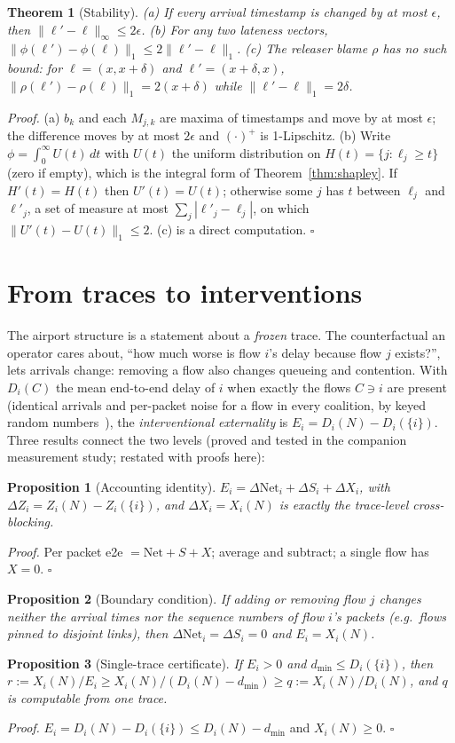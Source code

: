 \documentclass[11pt]{article}
\newtheorem{theorem}{Theorem}
\newtheorem{proposition}{Proposition}
\theoremstyle{definition}
\newcommand{\Net}{\mathrm{Net}}
\begin{document}
\begin{theorem}[Stability]\label{thm:stability}
(a) If every arrival timestamp is changed by at most $\epsilon$, then $\|\ell'-\ell\|_\infty\le2\epsilon$. (b) For any two lateness vectors, $\|\phi(\ell')-\phi(\ell)\|_1\le2\|\ell'-\ell\|_1$. (c) The releaser blame $\rho$ has no such bound: for $\ell=(x,x+\delta)$ and $\ell'=(x+\delta,x)$, $\|\rho(\ell')-\rho(\ell)\|_1=2(x+\delta)$ while $\|\ell'-\ell\|_1=2\delta$.
\end{theorem}
\emph{Proof.} (a) $b_k$ and each $M_{j,k}$ are maxima of timestamps and move by at most $\epsilon$; the difference moves by at most $2\epsilon$ and $(\cdot)^+$ is 1-Lipschitz. (b) Write $\phi=\int_0^\infty U(t)\,dt$ with $U(t)$ the uniform distribution on $H(t)=\{j:\ell_j\ge t\}$ (zero if empty), which is the integral form of Theorem~\ref{thm:shapley}. If $H'(t)=H(t)$ then $U'(t)=U(t)$; otherwise some $j$ has $t$ between $\ell_j$ and $\ell'_j$, a set of measure at most $\sum_j|\ell'_j-\ell_j|$, on which $\|U'(t)-U(t)\|_1\le2$. (c) is a direct computation. \hfill$\square$

\section{From traces to interventions}\label{sec:bridge}
The airport structure is a statement about a \emph{frozen} trace. The counterfactual an operator cares about, ``how much worse is flow $i$'s delay because flow $j$ exists?'', lets arrivals change: removing a flow also changes queueing and contention. With $D_i(C)$ the mean end-to-end delay of $i$ when exactly the flows $C\ni i$ are present (identical arrivals and per-packet noise for a flow in every coalition, by keyed random numbers~\cite{glasserman1992crn}), the \emph{interventional externality} is $E_i=D_i(N)-D_i(\{i\})$. Three results connect the two levels (proved and tested in the companion measurement study; restated with proofs here):
\begin{proposition}[Accounting identity]\label{prop:id}
$E_i=\Delta\Net_i+\Delta S_i+\Delta X_i$, with $\Delta Z_i=Z_i(N)-Z_i(\{i\})$, and $\Delta X_i=X_i(N)$ is exactly the trace-level cross-blocking.
\end{proposition}
\emph{Proof.} Per packet e2e $=\Net+S+X$; average and subtract; a single flow has $X=0$. \hfill$\square$
\begin{proposition}[Boundary condition]\label{prop:boundary}
If adding or removing flow $j$ changes neither the arrival times nor the sequence numbers of flow $i$'s packets (e.g.\ flows pinned to disjoint links), then $\Delta\Net_i=\Delta S_i=0$ and $E_i=X_i(N)$.
\end{proposition}
\begin{proposition}[Single-trace certificate]\label{prop:cert}
If $E_i>0$ and $d_{\min}\le D_i(\{i\})$, then $r:=X_i(N)/E_i\ge X_i(N)/(D_i(N)-d_{\min})\ge q:=X_i(N)/D_i(N)$, and $q$ is computable from one trace.
\end{proposition}
\emph{Proof.} $E_i=D_i(N)-D_i(\{i\})\le D_i(N)-d_{\min}$ and $X_i(N)\ge0$. \hfill$\square$
\end{document}
